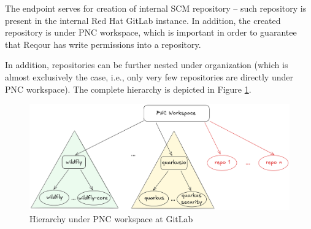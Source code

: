 \documentclass[../main.tex]{subfiles}
\begin{document}
The endpoint serves for creation of internal SCM repository – such repository is present in the internal Red Hat GitLab instance. In addition, the created repository is under PNC workspace, which is important in order to guarantee that Reqour has write permissions into a repository.

In addition, repositories can be further nested under organization (which is almost exclusively the case, i.e., only very few repositories are directly under PNC workspace). The complete hierarchy is depicted in Figure \ref{fig:gitlab-hierarchy}.

\begin{figure}
  \begin{center}
    \includegraphics[width=\textwidth]{images/gitlab-hierarchy.png}
  \end{center}
  \caption{Hierarchy under PNC workspace at GitLab}
  \label{fig:gitlab-hierarchy}
\end{figure}
\end{document}
